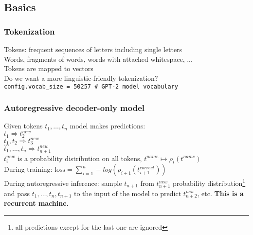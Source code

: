 \documentclass{beamer}
\begin{document}
\subsection{Basics}

\begin{frame}

  \frametitle{Tokenization}

Tokens: frequent sequences of letters including single letters\\[2ex]

Words, fragments of words, words with attached whitespace, ...\\[2ex]

Tokens are mapped to vectors\\[2ex]

Do we want a more linguistic-friendly tokenization?\\[2ex]

{\tt  config.vocab\_size = 50257 \# GPT-2 model vocabulary}\\[2ex]

\end{frame}

\begin{frame}

  \frametitle{Autoregressive decoder-only model}

Given tokens $t_1, \dots, t_n$ model makes predictions:\\[2ex]

$t_1 \Rightarrow t^{new}_2$\\
$t_1, t_2 \Rightarrow t^{new}_3$\\
$\dots$\\
$t_1, \dots, t_n  \Rightarrow t^{new}_{n+1}$\\[2ex]

$t^{new}_i$ is a probability distribution on all tokens, $t^{name} \mapsto \rho_i(t^{name})$\\[2ex]

During training:  $\mbox{loss} = \sum_{i=1}^{n} -log(\rho_{i+1}(t^{correct}_{i+1}))$\\[2ex]

During autoregressive inference: sample $t_{n+1}$ from $t^{new}_{n+1}$ probability
distribution\footnote{all predictions except for the last one are ignored}
and pass $t_1, \dots, t_n, t_{n+1}$ to the input of the model to predict  $t^{new}_{n+2}$, etc.
{\bf This is a recurrent machine.}

\end{frame}
\end{document}
